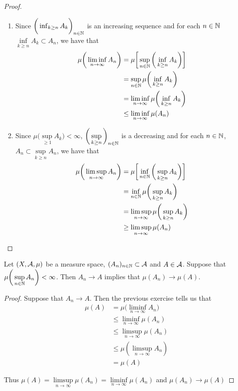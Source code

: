 \documentclass{book}
\begin{document}
	\begin{proof}\
		\begin{enumerate}
			\item Since $\bigg(\inf_{k \geq n}A_k \bigg)_{n \in \mathbb{N}}$ is an increasing sequence and for each $n \in \mathbb{N}$ $\inf\limits_{k \geq n}A_k \subset A_n$, we have that
			\begin{align*}
				\mu\bigg(\liminf\limits_{n \rightarrow \infty} A_n \bigg) 
				& = \mu \bigg[\sup\limits_{n \in \mathbb{N}} \bigg(\inf\limits_{k \geq n} A_k \bigg) \bigg] \\
				&= \sup\limits_{n \in \mathbb{N}}  \mu\bigg( \inf_{k \geq n}A_k\bigg)\\
				& = \liminf_{n \rightarrow \infty} \mu\bigg( \inf_{k \geq n}A_k\bigg) \\
				& \leq \liminf_{n \rightarrow \infty}  \mu(A_n) \\
			\end{align*}
			\item Since $\mu\bigg(\sup\limits_{ \geq 1}A_k \bigg) < \infty$, $\bigg(\sup\limits_{k \geq n} \bigg)_{n \in \mathbb{N}}$ is a decreasing and for each $n \in \mathbb{N}$, $A_n \subset \sup\limits_{k \geq n}A_n$, we have that 
			\begin{align*}
				\mu \bigg(\limsup_{n \rightarrow \infty} A_n 
				\bigg) 
				&= \mu \bigg[\inf_{n \in \mathbb{N}} \bigg(\sup\limits_{k  \geq n} A_k \bigg) \bigg] \\
				&= \inf_{n \in \mathbb{N}}\mu\bigg( \sup\limits_{k \geq n} A_k\bigg) \\
				& = \limsup_{n \rightarrow \infty} \mu \bigg( \sup\limits_{k \geq n}A_k \bigg) \\
				& \geq \limsup_{n \rightarrow \infty} \mu ( A_n )\
			\end{align*} 
		\end{enumerate}
	\end{proof}
	
	\begin{ex} 
		Let $(X, \mathcal{A}, \mu)$ be a measure space, $(A_n)_{n \in \mathbb{N}} \subset \mathcal{A}$ and $A \in \mathcal{A}$. Suppose that $\mu\bigg(\sup\limits_{n \in \mathbb{N}}A_n\bigg) < \infty$. Then $A_n \rightarrow A$ implies that $\mu(A_n) \rightarrow \mu(A)$. 
	\end{ex} 
	
	\begin{proof}
		Suppose that $A_n \rightarrow A$. Then the previous exercise tells us that 
		\begin{align*}
			\mu(A)
			&= \mu\bigg(\liminf\limits_{n \rightarrow \infty}A_n \bigg)\\
			& \leq \liminf_{n \rightarrow \infty} \mu(A_n)\\
			& \leq \limsup_{n \rightarrow \infty}\mu (A_n) \\
			& \leq \mu( \limsup_{n \rightarrow \infty} A_n) \\
			&= \mu (A)
		\end{align*}
		
		Thus $\mu(A) = \limsup\limits_{n \rightarrow \infty}\mu(A_n) = \liminf\limits_{n \rightarrow \infty}\mu(A_n)$ and $\mu(A_n) \rightarrow \mu(A)$
	\end{proof}
	
\end{document}
